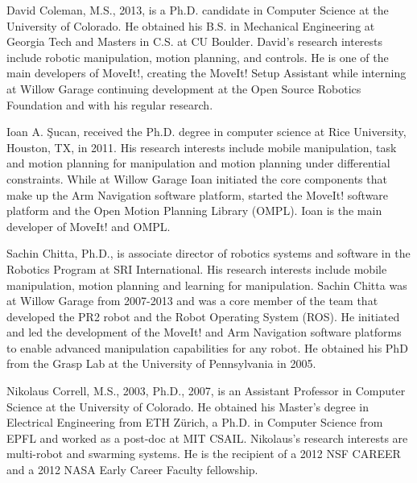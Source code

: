 \documentclass[10pt,journal,compsoc]{joser1}
\begin{document}
{%
\begin{IEEEbiography}[{coleman_20131110_f01}]{David Coleman}, M.S., 2013, is a
Ph.D. candidate in Computer Science at the University of Colorado. He obtained
his B.S. in Mechanical Engineering at Georgia Tech and Masters in C.S. at CU
Boulder. David's research interests include robotic manipulation, motion
planning, and controls. He is one of the main developers of MoveIt!, creating
the MoveIt! Setup Assistant while interning at Willow Garage continuing
development at the Open Source Robotics Foundation and with his regular
research.
\end{IEEEbiography}

\begin{IEEEbiography}[{coleman_20131110_f02}]{Ioan A. \c{S}ucan}, 
received the Ph.D. degree in computer science at Rice University,
Houston, TX, in 2011. His research interests include mobile
manipulation, task and motion planning for manipulation and motion
planning under differential constraints. While at Willow Garage
Ioan initiated the core components that make up the Arm
Navigation software platform, started the MoveIt! software platform
and the Open Motion Planning Library (OMPL). Ioan is the main
developer of MoveIt! and OMPL.
\end{IEEEbiography}

\begin{IEEEbiography}[{coleman_20131110_f03}]{Sachin Chitta}, Ph.D., is
associate director of robotics systems and software in the Robotics Program at
SRI International. His research interests include mobile manipulation, motion
planning and learning for manipulation. Sachin Chitta was at Willow Garage from
2007-2013 and was a core member of the team that developed the PR2 robot and the
Robot Operating System (ROS). He initiated and led the development of the
MoveIt! and Arm Navigation software platforms to enable advanced manipulation
capabilities for any robot. He obtained his PhD from the Grasp Lab at the
University of Pennsylvania in 2005.  
\end{IEEEbiography}

\begin{IEEEbiography}[{coleman_20131110_f04}]{Nikolaus Correll}, M.S., 2003,
Ph.D., 2007, is an Assistant Professor in Computer Science at the University of
Colorado. He obtained his Master's degree in Electrical Engineering from ETH
Z\"urich, a Ph.D. in Computer Science from EPFL and worked as a post-doc at MIT
CSAIL. Nikolaus's research interests are multi-robot and swarming systems. He is
the recipient of a 2012 NSF CAREER and a 2012 NASA Early Career Faculty
fellowship.
\end{IEEEbiography}


}
\end{document}
